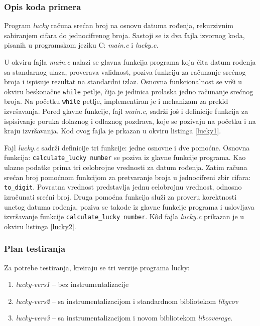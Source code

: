 \documentclass[12pt,oneside]{memoir}
\newcommand{\kod}[1]{\texttt{#1}}
\newcommand{\strano}[1]{\textit{#1}}
\begin{document}
\subsubsection{Opis koda primera}

Program \strano{lucky} računa srećan broj na osnovu datuma rođenja, rekurzivnim sabiranjem cifara do jednocifrenog broja. Sastoji se iz dva fajla izvornog koda, pisanih u programskom jeziku C: \strano{main.c} i \strano{lucky.c}.

U okviru fajla \strano{main.c} nalazi se glavna funkcija programa koja čita datum rođenja sa standarnog ulaza, proverava validnost, poziva funkciju za računanje srećnog broja i ispisuje rezultat na standardni izlaz. Osnovna funkcionalnost se vrši u okviru beskonačne \kod{while} petlje, čija je jedinica prolaska jedno računanje srećnog broja. Na početku \kod{while} petlje, implementiran je i mehanizam za prekid izvršavanja. Pored glavne funkcije, fajl \strano{main.c}, sadrži još i definicije funkcija za ispisivanje poruka dolaznog i odlaznog pozdrava, koje se pozivaju na početku i na kraju izvršavanja. Kod ovog fajla je prkazan u okviru listinga \ref{lucky1}.

Fajl \strano{lucky.c} sadrži definicije tri funkcije: jedne osnovne i dve pomoćne. Osnovna funkcija: \kod{calculate\_lucky\ number} se poziva iz glavne funkcije programa. Kao ulazne podatke prima tri celobrojne vrednosti za datum rođenja. Zatim računa srećan broj pomoćnom funkcijom za pretvaranje broja u jednocifreni zbir cifara: \kod{to\_digit}. Povratna vrednost predstavlja jednu celobrojnu vrednost, odnosno izračunati srećni broj. Druga pomoćna funkcija služi za proveru korektnosti unetog datuma rođenja, poziva se takođe iz glavne funkcije programa i uslovljava izvršavanje funkcije \kod{calculate\_lucky\ number}. K\^{o}d fajla \strano{lucky.c} prikazan je u okviru listinga \ref{lucky2}.
\\
\subsubsection{Plan testiranja}

Za potrebe testiranja, kreiraju se tri verzije programa lucky:
\begin{enumerate}
\item \strano{lucky-vers1} – bez instrumentalizacije
\item \strano{lucky-vers2} – sa instrumentalizacijom i standardnom bibliotekom \strano{libgcov}
\item \strano{lucky-vers3} – sa instrumentalizacijom i novom bibliotekom \strano{libcoverage}. 
\end{enumerate}
\end{document}
